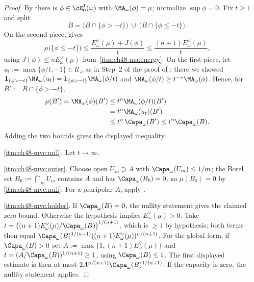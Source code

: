 \begin{proof}
By  there is $\phi\in\cE^1_0(\omega)$ with
$\MA_\omega(\phi)=\mu$; normalize $\sup\phi=0$.  Fix $t\ge1$ and split
\[
 B=\bigl(B\cap\{\phi>-t\}\bigr)\ \cup\ \bigl(B\cap\{\phi\le-t\}\bigr).
\]
On the second piece,  gives
\[
 \mu\bigl(\{\phi\le-t\}\bigr)\le\frac{E^\vee_\omega(\mu)+J(\phi)}t
 \le\frac{(n+1)E^\vee_\omega(\mu)}t ,
\]
using $J(\phi)\le nE^\vee_\omega(\mu)$ from
\,\cref{itm:ch48-ma:energy}.  On the first
piece, let $u_t:=\max\{\phi/t,-1\}\in\mathcal U_\omega$ as in Step~2 of
the proof of ; there we showed
$\mathbf 1_{\{\phi>-t\}}\MA_\omega(u_t)
=\mathbf 1_{\{\phi>-t\}}\MA_\omega(\phi/t)$ and
$\MA_\omega(\phi/t)\ge t^{-n}\MA_\omega(\phi)$.  Hence, for
$B':=B\cap\{\phi>-t\}$,
\[
 \begin{aligned}
 \mu(B')=\MA_\omega(\phi)(B')
 &\le t^n\MA_\omega(\phi/t)(B')\\
 &=t^n\MA_\omega(u_t)(B')\\
 &\le t^n\,\Capa_\omega(B') \le t^n\Capa_\omega(B).
 \end{aligned}
\]
Adding the two bounds gives the displayed inequality.

\cref{itm:ch48-mvc:null}.  Let $t\to\infty$.

\cref{itm:ch48-mvc:outer}.  Choose open $U_m\supset A$ with
$\Capa_\omega(U_m)\le1/m$; the Borel set $B_0:=\bigcap_mU_m$ contains
$A$ and has $\Capa_\omega(B_0)=0$, so $\mu(B_0)=0$ by
\cref{itm:ch48-mvc:null}.  For a pluripolar $A$, apply
.

\cref{itm:ch48-mvc:holder}. If $\Capa_\omega(B)=0$, the nullity
statement gives the claimed zero bound. Otherwise the hypothesis implies
$E^\vee_\omega(\mu)>0$. Take
$t=\bigl((n+1)E^\vee_\omega(\mu)/\Capa_\omega(B)\bigr)^{1/(n+1)}$, which
is $\ge1$ by hypothesis; both terms then equal
$\Capa_\omega(B)^{1/(n+1)}((n+1)E^\vee_\omega(\mu))^{n/(n+1)}$.
For the global form, if $\Capa_\omega(B)>0$ set
$A:=\max\{1,(n+1)E^\vee_\omega(\mu)\}$ and
$t=(A/\Capa_\omega(B))^{1/(n+1)}\ge1$, using
$\Capa_\omega(B)\le1$. The first displayed estimate is then at most
$2A^{n/(n+1)}\Capa_\omega(B)^{1/(n+1)}$.
If the capacity is zero, the nullity statement applies.
\end{proof}

